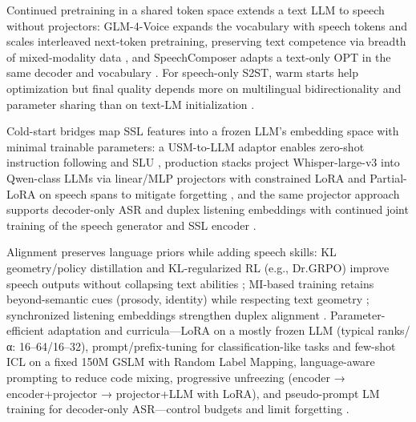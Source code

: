 \documentclass{article}
\begin{document}
Continued pretraining in a shared token space extends a text LLM to speech without projectors: GLM-4-Voice expands the vocabulary with speech tokens and scales interleaved next-token pretraining, preserving text competence via breadth of mixed-modality data \cite{zeng2024scalingspeechtextpretrainingsyntheticint}, and SpeechComposer adapts a text-only OPT in the same decoder and vocabulary \cite{wu2024speechcomposerunifyingmultiplespeechtask}. For speech-only S2ST, warm starts help optimization but final quality depends more on multilingual bidirectionality and parameter sharing than on text-LM initialization \cite{peng2024mslms2stmultitaskspeechlanguagemodeltext}.

Cold-start bridges map SSL features into a frozen LLM’s embedding space with minimal trainable parameters: a USM-to-LLM adaptor enables zero-shot instruction following and SLU \cite{wang2023slmbridgethingapbetweenspeechtextfoundat}, production stacks project Whisper-large-v3 into Qwen-class LLMs via linear/MLP projectors with constrained LoRA and Partial-LoRA on speech spans to mitigate forgetting \cite{wang2024blspemotowardsempatheticlargespeechlangu}, and the same projector approach supports decoder-only ASR and duplex listening embeddings with continued joint training of the speech generator and SSL encoder \cite{tsunoo2024decoderonlyarchitecturespeechrecognition,ma2024languagemodelcanlistenwhilespeaking}.

Alignment preserves language priors while adding speech skills: KL geometry/policy distillation and KL-regularized RL (e.g., Dr.GRPO) improve speech outputs without collapsing text abilities \cite{wang2024blspemotowardsempatheticlargespeechlangu,li2025seewossubmissionmlcslmlessonslearnedspee}; MI-based training retains beyond-semantic cues (prosody, identity) while respecting text geometry \cite{wang2025bossbeyondsemanticspeech}; synchronized listening embeddings strengthen duplex alignment \cite{ma2024languagemodelcanlistenwhilespeaking}. Parameter-efficient adaptation and curricula—LoRA on a mostly frozen LLM (typical ranks/α: 16–64/16–32), prompt/prefix-tuning for classification-like tasks and few-shot ICL on a fixed 150M GSLM with Random Label Mapping, language-aware prompting to reduce code mixing, progressive unfreezing (encoder → encoder+projector → projector+LLM with LoRA), and pseudo-prompt LM training for decoder-only ASR—control budgets and limit forgetting \cite{hsu2024exploringcontextlearningtextlessspeechla,li2025seewossubmissionmlcslmlessonslearnedspee,nguyen2025qwenvsgemmaintegrationwhispercomparative,tsunoo2024decoderonlyarchitecturespeechrecognition}.
\end{document}
